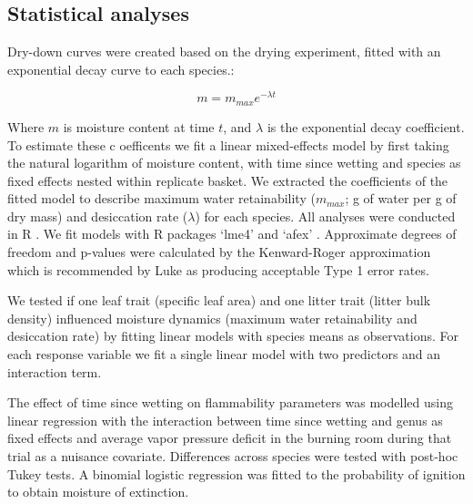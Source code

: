 \documentclass[fire,article,submit,moreauthors,pdftex]{Definitions/mdpi}
\begin{document}
\subsection{Statistical analyses}


Dry-down curves were created based on the drying experiment, fitted with an exponential decay curve to each species.:

\begin{equation}
m = m_{max} e^{-\lambda t}
\end{equation}

Where $m$ is moisture content at time $t$, and $\lambda$ is the exponential decay coefficient. To estimate these c oefficents we fit a linear mixed-effects model by first taking the natural logarithm of moisture content, with time since wetting and species as fixed effects nested within replicate basket. We extracted the coefficients of the fitted model to describe maximum water retainability ($m_{max}$; g of water per g of dry mass) and desiccation rate ($\lambda$) for each species. All analyses were conducted in R \cite{RCoreTeam-2019}. We fit models with R packages `lme4' \cite{Bates_Machler_etal-2015} and `afex' \cite{Singmann_Bolker_etal-2017}.  Approximate degrees of freedom and p-values were calculated by the Kenward-Roger approximation \cite{Kenward_Roger-1997} which is recommended by Luke \cite{Luke-2017} as producing acceptable Type 1 error rates.

We tested if one leaf trait (specific leaf area) and one litter trait (litter
bulk density) influenced moisture dynamics (maximum water retainability and
desiccation rate) by fitting linear models with species means as observations.
For each response variable we fit a single linear model with two predictors and
an interaction term.

The effect of time since wetting on flammability parameters was modelled using linear regression with the interaction between time since wetting and genus as fixed effects and average vapor pressure deficit in the burning room during that trial as a nuisance covariate. Differences across species were tested with post-hoc Tukey tests. A binomial logistic regression was fitted to the probability of ignition to obtain moisture of extinction.
\end{document}
